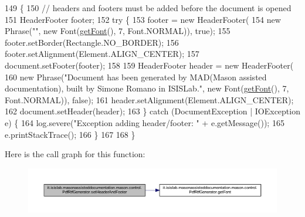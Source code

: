 \begin{DoxyCode}
149                                                        \{
150         \textcolor{comment}{// headers and footers must be added before the document is opened}
151         HeaderFooter footer;
152         \textcolor{keywordflow}{try} \{
153             footer = \textcolor{keyword}{new} HeaderFooter(
154                         \textcolor{keyword}{new} Phrase(\textcolor{stringliteral}{""}, \textcolor{keyword}{new} Font(\hyperlink{classit_1_1isislab_1_1masonassisteddocumentation_1_1mason_1_1control_1_1_pdf_rtf_generator_ae256fb15c0845470ad900c876a15fabf}{getFont}(), 7, Font.NORMAL)), \textcolor{keyword}{true});
155             footer.setBorder(Rectangle.NO\_BORDER);
156                         footer.setAlignment(Element.ALIGN\_CENTER);
157                         document.setFooter(footer);
158 
159                         HeaderFooter header = \textcolor{keyword}{new} HeaderFooter(
160                                     \textcolor{keyword}{new} Phrase(\textcolor{stringliteral}{"Document has been generated by MAD(Mason assisted
       documentation), built by Simone Romano in ISISLab."}, \textcolor{keyword}{new} Font(\hyperlink{classit_1_1isislab_1_1masonassisteddocumentation_1_1mason_1_1control_1_1_pdf_rtf_generator_ae256fb15c0845470ad900c876a15fabf}{getFont}(), 7, Font.NORMAL)), \textcolor{keyword}{false});
161                         header.setAlignment(Element.ALIGN\_CENTER);
162                         document.setHeader(header);
163         \} \textcolor{keywordflow}{catch} (DocumentException | IOException e) \{
164             log.severe(\textcolor{stringliteral}{"Exception adding header/footer: "} + e.getMessage());
165             e.printStackTrace();
166         \}
167         
168     \}
\end{DoxyCode}


Here is the call graph for this function\-:
\nopagebreak
\begin{figure}[H]
\begin{center}
\leavevmode
\includegraphics[width=350pt]{classit_1_1isislab_1_1masonassisteddocumentation_1_1mason_1_1control_1_1_pdf_rtf_generator_add96cb1e39ece24ace1e42aae99082a0_cgraph}
\end{center}
\end{figure}





